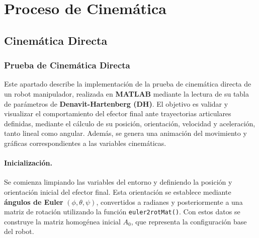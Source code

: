 \section{Proceso de Cinemática} \label{sec:proceso_cinematica}





\subsection{Cinemática Directa}
\subsubsection{Prueba de Cinemática Directa}

Este apartado describe la implementación de la prueba de cinemática directa de un robot manipulador, realizada en \textbf{MATLAB} mediante la lectura de su tabla de parámetros de \textbf{Denavit-Hartenberg (DH)}. El objetivo es validar y visualizar el comportamiento del efector final ante trayectorias articulares definidas, mediante el cálculo de su posición, orientación, velocidad y aceleración, tanto lineal como angular. Además, se genera una animación del movimiento y gráficas correspondientes a las variables cinemáticas.

\paragraph{Inicialización.}

Se comienza limpiando las variables del entorno y definiendo la posición y orientación inicial del efector final. Esta orientación se establece mediante \textbf{ángulos de Euler} $(\phi, \theta, \psi)$, convertidos a radianes y posteriormente a una matriz de rotación utilizando la función \texttt{euler2rotMat()}. Con estos datos se construye la matriz homogénea inicial $A_0$, que representa la configuración base del robot.

